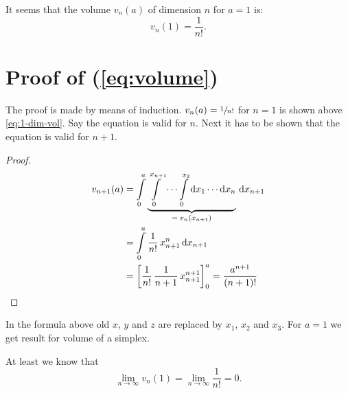 \documentclass[11pt,paper=a4,oneside,ngerman,english,parskip=half]{scrartcl}
\begin{document}
It seems that the volume $v_n(a)$ of dimension $n$ for $a = 1$ is:
\begin{equation}
\label{eq:volume}
v_n(1) = \frac{1}{n!}.
\end{equation}


\section{Proof of (\ref{eq:volume})}
The proof is made by means of induction.
$v_n(a) = \sfrac{1}{n!}$ for $n = 1$ is shown above \eqref{eq:1-dim-vol}. Say the equation is valid for $n$. Next it has to be shown that the equation is valid for $n+1$.
\begin{proof}
\begin{align}
v_{n+1}(a) &= \int\limits_{0}^{a} \underbrace{\int\limits_{0}^{x_{n+1}} \cdots \int\limits_{0}^{x_2} \text{d}x_1 \cdots \text{d}x_n}_{=\;v_n(x_{n+1})}  \,\text{d}x_{n+1} \\
 &= \int\limits_{0}^{a} \frac{1}{n!} \, x_{n+1}^n \,\text{d}x_{n+1} \\
 &= \left[\frac{1}{n!}\,\frac{1}{n+1}\,x_{n+1}^{n+1} \right]_0^{a} = \frac{a^{n+1}}{(n+1)!} \qedhere
\end{align}
\end{proof}

In the formula above old $x$, $y$ and $z$ are replaced by $x_1$, $x_2$ and $x_3$. For $a = 1$ we get result for volume of a simplex.

At least we know that
\begin{equation}
\lim\limits_{n\rightarrow \infty}v_n(1) = \lim\limits_{n\rightarrow \infty} \frac{1}{n!} = 0.
\end{equation}


\printbibliography[title=Weiterführende Literatur]
\end{document}
